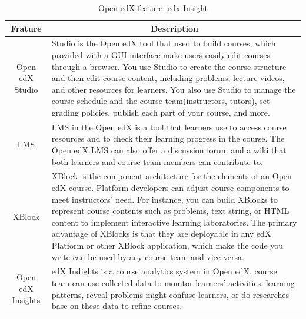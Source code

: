 \begin{table}[H]
\centering
\begin{tabular}{|c|p{12cm}|}
\hline
Frature           & \multicolumn{1}{c|}{Description}                                                                                                                                                                                                                                                                                                                                                                                                                                                                                    \\ \hline
Open edX Studio   & Studio is the Open edX tool that used to build courses, which provided with a GUI interface make users easily edit courses through a browser. You use Studio to create the course structure and then edit course content, including problems, lecture videos, and other resources for learners. You also use Studio to manage the course schedule and the course team(instructors, tutors), set grading policies, publish each part of your course, and more.                                                       \\ \hline
LMS               & LMS in the Open edX is a tool that learners use to access course resources and to check their learning progress in the course. The Open edX LMS can also offer a discussion forum and a wiki that both learners and course team members can contribute to.                                                                                                                                                                                                                                                          \\ \hline
XBlock            & XBlock is the component architecture for the elements of an Open edX course. Platform developers can adjust course components to meet instructors' need. For instance, you can build XBlocks to represent course contents such as problems, text string, or HTML content to implement interactive learning laboratories. The primary advantage of XBlocks is that they are deployable in any edX Platform or other XBlock application, which make the code you write can be used by any course team and vice versa. \\ \hline
Open edX Insights & edX Indights is a course analytics system in Open edX, course team can use collected data to monitor learners' activities, learning patterns, reveal problems might confuse learners, or do researches base on these data to refine courses.                                                                                                                                                                                                                                                                        \\ \hline
\end{tabular}
\caption{Open edX feature: edx Insight}
\label{table:edxinsight}
\end{table}


